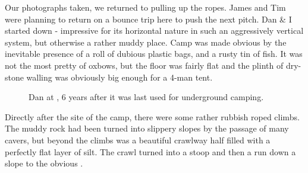 Our photographs taken, we returned to  pulling up the
ropes. James and Tim were planning to return on a bounce trip here to
push the next pitch. Dan \& I started down  -
impressive for its horizontal nature in such an aggressively vertical
system, but otherwise a rather muddy place. Camp  was made
obvious by the inevitable presence of a roll of dubious plastic bags,
and a rusty tin of fish. It was not the most pretty of oxbows, but the
floor was fairly flat and the plinth of dry-stone walling was obviously
big enough for a 4-man tent.


\begin{figure}
\checkoddpage \ifoddpage \forcerectofloat \else \forceversofloat \fi
\centering
 \caption{Dan at \protect{}, 6 years after it was last used for underground camping. }
 \label{xray 2009}
\end{figure}






Directly after the site of the camp, there were some rather rubbish
roped climbs. The muddy rock had been turned into slippery slopes by the
passage of many cavers, but beyond the climbs was a beautiful crawlway
half filled with a perfectly flat layer of silt. The crawl turned into a
stoop and then a run down a slope to the obvious .

